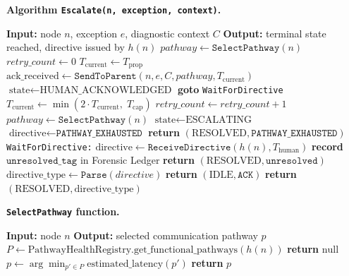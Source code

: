 \bigskip
\noindent\textbf{Algorithm \texttt{Escalate(n, exception, context)}.}
\begin{algorithmic}
\STATE \textbf{Input:} node $n$, exception $e$, diagnostic context $C$
\STATE \textbf{Output:} terminal state reached, directive issued by $h(n)$
\STATE
\STATE $pathway \leftarrow \texttt{SelectPathway}(n)$
\STATE $retry\_count \leftarrow 0$
\STATE $T_{\text{current}} \leftarrow T_{\text{prop}}$
\STATE
{}
    \STATE $\text{ack\_received} \leftarrow \texttt{SendToParent}(n, e, C, pathway, T_{\text{current}})$
        \STATE $\text{state} \leftarrow \text{HUMAN\_ACKNOWLEDGED}$
        \STATE \textbf{goto} \texttt{WaitForDirective}
    \ENDIF
    \STATE $T_{\text{current}} \leftarrow \min(2 \cdot T_{\text{current}},\; T_{\text{cap}})$
    \STATE $retry\_count \leftarrow retry\_count + 1$
    \STATE $pathway \leftarrow \texttt{SelectPathway}(n)$ 
\ENDWHILE
\STATE
\STATE {}
\STATE $\text{state} \leftarrow \text{ESCALATING}$
\STATE $\text{directive} \leftarrow \texttt{PATHWAY\_EXHAUSTED}$
\STATE \textbf{return} $(\text{RESOLVED}, \texttt{PATHWAY\_EXHAUSTED})$
\STATE
\STATE \texttt{WaitForDirective:}
\STATE $\text{directive} \leftarrow \texttt{ReceiveDirective}(h(n), T_{\text{human}})$
    \STATE \textbf{record} $\texttt{unresolved\_tag}$ in Forensic Ledger
    \STATE \textbf{return} $(\text{RESOLVED}, \texttt{unresolved})$
\ENDIF
\STATE $\text{directive\_type} \leftarrow \texttt{Parse}(directive)$
    \STATE \textbf{return} $(\text{IDLE}, \texttt{ACK})$
    \STATE \textbf{return} $(\text{RESOLVED}, \text{directive\_type})$
\ENDIF
\end{algorithmic}

\bigskip
\noindent\textbf{\texttt{SelectPathway} function.}
\begin{algorithmic}
\STATE \textbf{Input:} node $n$
\STATE \textbf{Output:} selected communication pathway $p$
\STATE
\STATE $P \leftarrow \text{PathwayHealthRegistry.get\_functional\_pathways}(h(n))$
\STATE {}
    \STATE \textbf{return} $\text{null}$ 
\ENDIF
\STATE $p \leftarrow \arg\min_{p' \in P} \text{estimated\_latency}(p')$
\STATE \textbf{return} $p$
\end{algorithmic}

